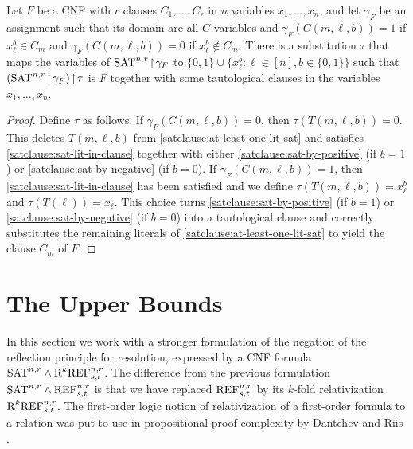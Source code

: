 \begin{proposition}
\label{propos:subst-to-SAT}
Let $F$ be a CNF with $r$ clauses $C_1,\ldots, C_r$ in $n$ variables $x_1,\ldots, x_n$, and let $\gamma_F$ be an assignment such that its domain are all $C$-variables and $\gamma_F (C(m,\ell,b)) = 1$ if $x_\ell^b \in C_m$ and $\gamma_F (C(m,\ell,b)) = 0$ if $x_\ell^b \notin C_m$. There is a substitution $\tau$ that maps the variables of $\textnormal{SAT}^{n,r} \! \restriction \! \gamma_F$ to $\{0,1\} \cup \{ x_\ell^b : \ell \in [n], b \in \{0,1\} \}$ such that $( \textnormal{SAT}^{n,r} \! \restriction \! \gamma_F ) \! \restriction \! \tau$ is $F$ together with some tautological clauses in the variables $x_1,\ldots, x_n$. 
\end{proposition}

\begin{proof}
Define $\tau$ as follows. If $\gamma_F(C(m,\ell,b)) = 0$, then $\tau(T(m,\ell,b)) = 0$. This deletes $T(m,\ell,b)$ from \eqref{satclause:at-least-one-lit-sat} and satisfies \eqref{satclause:sat-lit-in-clause} together with either \eqref{satclause:sat-by-positive} (if $b=1$) or \eqref{satclause:sat-by-negative} (if $b=0$). 
If $\gamma_F(C(m,\ell,b)) = 1$, then \eqref{satclause:sat-lit-in-clause} has been satisfied and we define $\tau(T(m,\ell,b)) = x_\ell^b$ and $\tau(T(\ell)) = x_\ell$. This choice turns \eqref{satclause:sat-by-positive} (if $b=1$) or \eqref{satclause:sat-by-negative} (if $b=0$) into a tautological clause and correctly substitutes the remaining literals of \eqref{satclause:at-least-one-lit-sat} to yield the clause $C_m$ of $F$.
\end{proof}



\section{The Upper Bounds}
\label{sec:refl-princ-upper-bound}



In this section we work with a stronger formulation of the negation of the reflection principle for resolution, expressed by a CNF formula $\textnormal{SAT}^{n,r} \land \textnormal{R}^k\textnormal{REF}^{n,r}_{s,t}$. The difference from the previous formulation $\textnormal{SAT}^{n,r} \land \textnormal{REF}^{n,r}_{s,t}$ is that we have replaced $\textnormal{REF}^{n,r}_{s,t}$ by its $k$-fold relativization $\textnormal{R}^k\textnormal{REF}^{n,r}_{s,t}$. The first-order logic notion of relativization of a first-order formula to a relation was put to use in propositional proof complexity by Dantchev and Riis \cite{Dantchev-Riis2003}. 

